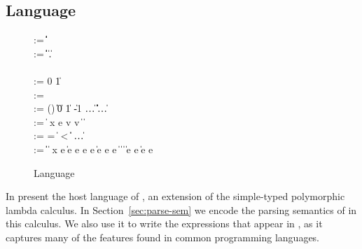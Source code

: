 \subsection{\Implang{} Language}
\label{sec:host-lang}
\begin{figure}[tp]
\small
\begin{bnf}
    \::= 
  \iboolty \| \iintty \| \iunitty \| 
  \invty \nlalt \iecty \| \ioffty \| \ibitsty
  \\
   \meta{\ity} \::= 
      \ibasety \| \ityvar \| \iarrow \ity \ity \| \iprod \ity \ity \|
      \isum \ity \ity \nlalt
      \iseq \ity \| \forall \ityvar.\ity  \|
      \imu \ityvar \ity   
  \\
    \\

        \::= 0 \| 1 \\ 
       \::=  \\ 
    \::=
      () \| \itrue \| \ifalse \| 0 \| 1 \| -1 \| \dots \nlalt
      \ierr \| \data \| \off \| \iok \| \iecerr \| \iecpc \| \ldots \\

    \::= 
      \const \| %
       {\nrm x} e \nlalt
      \ipair v v \|  \|  \nlalt
       \\

    \::= 
      = \; \| \; < \; \| \inotop \| \isizeofop
      \| \ldots \\

    \::= 
      \const \| \var \|  \|
       {\nrm x} e \| 
      \iapp e e \nlalt
       e \; e \|
      \iif e \; \ithen e \; \ielse e \nlalt
       \|  \|
       \|  \nlalt
       \nlalt
       \| \iappend e e \| \isub e {\nrm e}
\end{bnf}
\caption{\Implang{} Language}
\label{fig:implang-syntax}
\end{figure}

In  present the host language of \ddc{}, an
extension of the simple-typed polymorphic lambda calculus. In
Section~\ref{sec:parse-sem} we encode the parsing semantics of \ddc{}
in this calculus. We also use it to write the expressions that appear
in \ddc{}, as it captures many of the features found in common
programming languages.


